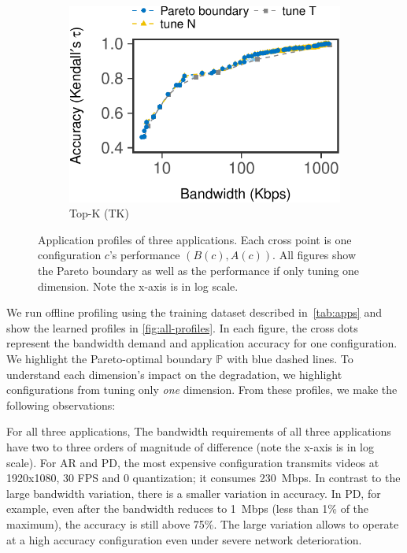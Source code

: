 \begin{figure}
\begin{subfigure}[t]{0.45\textwidth}
    \centering
    \includegraphics[width=\textwidth]{figures/profile-topk.pdf}
    \caption{Top-K (TK)}
    \label{fig:tk-profile}
  \end{subfigure}
  \caption{Application profiles of three applications. Each cross point is one
    configuration $c$'s performance $(B(c), A(c))$. All figures show the Pareto
    boundary as well as the performance if only tuning one dimension. Note the
    x-axis is in log scale.}
  \label{fig:all-profiles}
\end{figure}

We run offline profiling using the training dataset described
in~\autoref{tab:apps} and show the learned profiles in
\autoref{fig:all-profiles}. In each figure, the cross dots represent the
bandwidth demand and application accuracy for one configuration. We highlight
the Pareto-optimal boundary $\mathbb{P}$ with blue dashed lines. To understand
each dimension's impact on the degradation, we highlight configurations from
tuning only \textit{one} dimension. From these profiles, we make the following
observations:

 For all three applications, The bandwidth
requirements of all three applications have two to three orders of magnitude of
difference (note the x-axis is in log scale). For AR and PD, the most expensive
configuration transmits videos at 1920x1080, 30 FPS and 0 quantization; it
consumes \SI{230}{Mbps}. In contrast to the large bandwidth variation, there is
a smaller variation in accuracy. In PD, for example, even after the bandwidth
reduces to \SI{1}{Mbps} (less than 1\% of the maximum), the accuracy is still
above 75\%. The large variation allows \sysname{} to operate at a high accuracy
configuration even under severe network deterioration.


